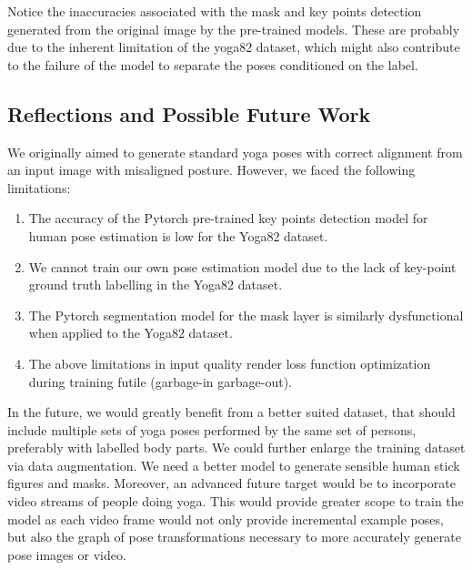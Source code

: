 \documentclass{article}
\begin{document}
\noindent
Notice the inaccuracies associated with the mask and key points detection generated from the original image by the pre-trained models. These are probably due to the inherent limitation of the yoga82 dataset, which might also contribute to the failure of the model to separate the poses conditioned on the label. 

\subsection{Reflections and Possible Future Work}

We originally aimed to generate standard yoga poses with correct alignment from an input image with misaligned posture. However, we faced the following limitations:

\begin{enumerate}
\item The accuracy of the Pytorch pre-trained key points detection model for human pose estimation is low for the Yoga82 dataset. 
\item We cannot train our own pose estimation model due to the lack of key-point ground truth labelling in the Yoga82 dataset. 
\item The Pytorch segmentation model for the mask layer is similarly dysfunctional when applied to the Yoga82 dataset.
\item The above limitations in input quality render loss function optimization during training futile (garbage-in garbage-out).  
\end{enumerate}

\noindent
In the future, we would greatly benefit from a better suited dataset, that should include multiple sets of yoga poses performed by the same set of persons, preferably with labelled body parts.  We could further enlarge the training dataset via data augmentation. We need a better model to generate sensible human stick figures and masks. Moreover, an advanced future target would be to incorporate video streams of people doing yoga. This would provide greater scope to train the model as each video frame would not only provide incremental example poses, but also the graph of pose transformations necessary to more accurately generate pose images or video. 
\end{document}
